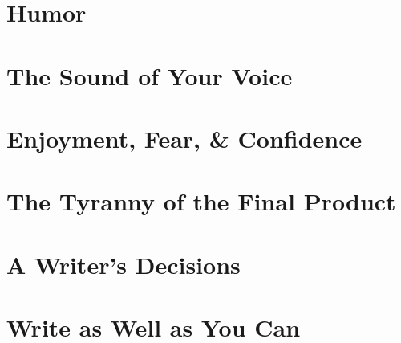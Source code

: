 \documentclass{article}
\begin{document}

\section{Humor}


\section{The Sound of Your Voice}


\section{Enjoyment, Fear, \& Confidence}


\section{The Tyranny of the Final Product}


\section{A Writer's Decisions}


\section{Write as Well as You Can}


\printbibliography[heading=bibintoc]
\end{document}

